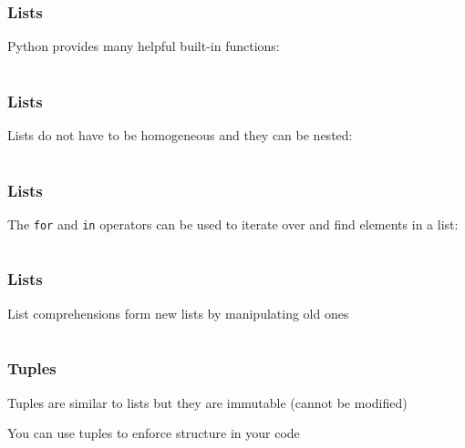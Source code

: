 \documentclass{beamer}
\begin{document}
\begin{frame}
\frametitle{Lists}
Python provides many helpful built-in functions:

\begin{center}
\begin{tabular}{c}

\end{tabular}
\end{center}

\end{frame}

\begin{frame}
\frametitle{Lists}

Lists do not have to be homogeneous and they can be nested:

\begin{center}
\begin{tabular}{c}

\end{tabular}
\end{center}

\end{frame}


\begin{frame}
\frametitle{Lists}

The \texttt{for} and \texttt{in} operators can be used to iterate over and find elements in a list:

\begin{center}
\begin{tabular}{c}

\end{tabular}
\end{center}

\end{frame}


\begin{frame}
\frametitle{Lists}

List comprehensions form new lists by manipulating old ones

\begin{center}
\begin{tabular}{c}

\end{tabular}
\end{center}

\end{frame}


\begin{frame}
\frametitle{Tuples}

Tuples are similar to lists but they are immutable (cannot be modified)

\vspace{0.1in}

You can use tuples to enforce structure in your code
\end{frame}
\end{document}
